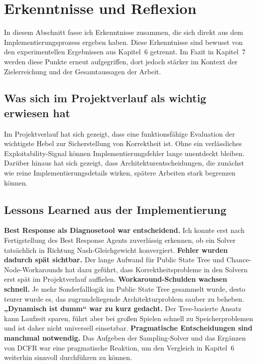 \section{Erkenntnisse und Reflexion}

In diesem Abschnitt fasse ich Erkenntnisse zusammen, die sich direkt aus dem Implementierungsprozess ergeben haben.
Diese Erkenntnisse sind bewusst von den experimentellen Ergebnissen aus Kapitel~6 getrennt.
Im Fazit in Kapitel~7 werden diese Punkte erneut aufgegriffen, dort jedoch stärker im Kontext der Zielerreichung und der Gesamtaussagen der Arbeit.

\subsection{Was sich im Projektverlauf als wichtig erwiesen hat}
Im Projektverlauf hat sich gezeigt, dass eine funktionsfähige Evaluation der wichtigste Hebel zur Sicherstellung von Korrektheit ist.
Ohne ein verlässliches Exploitability-Signal können Implementierungsfehler lange unentdeckt bleiben.
Darüber hinaus hat sich gezeigt, dass Architekturentscheidungen, die zunächst wie reine Implementierungsdetails wirken, spätere Arbeiten stark begrenzen können.

\subsection{Lessons Learned aus der Implementierung}
\textbf{Best Response als Diagnosetool war entscheidend.}
Ich konnte erst nach Fertigstellung des Best Response Agents zuverlässig erkennen, ob ein Solver tatsächlich in Richtung Nash-Gleichgewicht konvergiert.
\textbf{Fehler wurden dadurch spät sichtbar.}
Der lange Aufwand für Public State Tree und Chance-Node-Workarounds hat dazu geführt, dass Korrektheitsprobleme in den Solvern erst spät im Projektverlauf auffielen.
\textbf{Workaround-Schulden wachsen schnell.}
Je mehr Sonderfalllogik im Public State Tree gesammelt wurde, desto teurer wurde es, das zugrundeliegende Architekturproblem sauber zu beheben.
\textbf{„Dynamisch ist dumm“ war zu kurz gedacht.}
Der Tree-basierte Ansatz kann Laufzeit sparen, führt aber bei großen Spielen schnell zu Speicherproblemen und ist daher nicht universell einsetzbar.
\textbf{Pragmatische Entscheidungen sind manchmal notwendig.}
Das Aufgeben der Sampling-Solver und das Ergänzen von DCFR war eine pragmatische Reaktion, um den Vergleich in Kapitel~6 weiterhin sinnvoll durchführen zu können.

